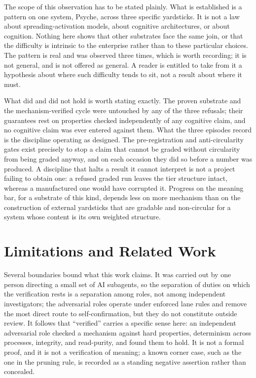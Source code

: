 \documentclass[conference]{IEEEtran}
\begin{document}
The scope of this observation has to be stated plainly. What is established is a pattern on one
system, Psyche, across three specific yardsticks. It is not a law about spreading-activation
models, about cognitive architectures, or about cognition. Nothing here shows that other
substrates face the same join, or that the difficulty is intrinsic to the enterprise rather
than to these particular choices. The pattern is real and was observed three times, which is
worth recording; it is not general, and is not offered as general. A reader is entitled to take
from it a hypothesis about where such difficulty tends to sit, not a result about where it must.

What did and did not hold is worth stating exactly. The proven substrate and the
mechanism-verified cycle were untouched by any of the three refusals; their guarantees rest on
properties checked independently of any cognitive claim, and no cognitive claim was ever entered
against them. What the three episodes record is the discipline operating as designed. The
pre-registration and anti-circularity gates exist precisely to stop a claim that cannot be
graded without circularity from being graded anyway, and on each occasion they did so before a
number was produced. A discipline that halts a result it cannot interpret is not a project
failing to obtain one: a refused graded run leaves the tier structure intact, whereas a
manufactured one would have corrupted it. Progress on the meaning bar, for a substrate of this
kind, depends less on more mechanism than on the construction of external yardsticks that are
gradable and non-circular for a system whose content is its own weighted structure.

\section{Limitations and Related Work}\label{sec:limrelated}
Several boundaries bound what this work claims. It was carried out by one person directing a
small set of AI subagents, so the separation of duties on which the verification rests is a
separation among roles, not among independent investigators; the adversarial roles operate
under enforced lane rules and remove the most direct route to self-confirmation, but they do
not constitute outside review. It follows that ``verified'' carries a specific sense here: an
independent adversarial role checked a mechanism against hard properties, determinism across
processes, integrity, and read-purity, and found them to hold. It is not a formal proof, and it
is not a verification of meaning; a known corner case, such as the one in the pruning rule, is
recorded as a standing negative assertion rather than concealed.
\end{document}
